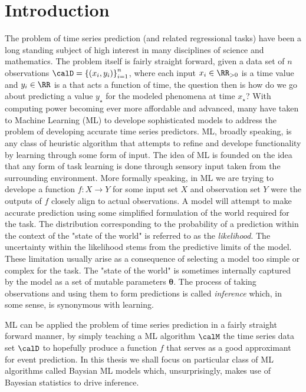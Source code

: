 \section*{Introduction}
The problem of time series prediction (and related regressional tasks) have been a long standing subject of high interest in many disciplines of science and mathematics. The problem itself is fairly straight forward, given a data set of $n$ observations $\calD = \left\{ \left( x_i , y_i \right) \right\}_{i=1}^{n}$, where each input $x_i \in \RR_{>0}$ is a time value and $y_i \in \RR$ is a that acts a function of time, the question then is how do we go about predicting a value $y_{\star}$ for the modeled phenomena at time $x_{\star}$? With computing power becoming ever more affordable and advanced, many have taken to Machine Learning (ML) to develope sophisticated models to address the problem of developing accurate time series predictors. ML, broadly speaking, is any class of heuristic algorithm that attempts to refine and develope functionality by learning through some form of input. The idea of ML is founded on the idea that any form of task learning is done through sensory input taken from the surrounding environment. More formally speaking, in ML we are trying to develope a function $f : X \to Y$ for some input set $X$ and observation set $Y$ were the outputs of $f$ closely align to actual observations. A model will attempt to make accurate prediction using some simplified formulation of the world required for the task. The distribution corresponding to the probability of a prediction within the context of the "state of the world" is referred to as the {\it likelihood}. The uncertainty within the likelihood stems from the predictive limits of the model. These limitation usually arise as a consequence of selecting a model too simple or complex for the task. The "state of the world" is sometimes internally captured by the model as a set of mutable parameters $\bm{\theta}$. The process of taking observations and using them to form predictions is called {\it inference} which, in some sense, is synonymous with learning.

ML can be applied the problem of time series prediction in a fairly straight forward manner, by simply teaching a ML algorithm $\calM$ the time series data set $\calD$ to hopefully produce a function $f$ that serves as a good approximant for event prediction. In this thesis we shall focus on particular class of ML algorithms called Baysian ML models which, unsurprisingly, makes use of Bayesian statistics to drive inference.

